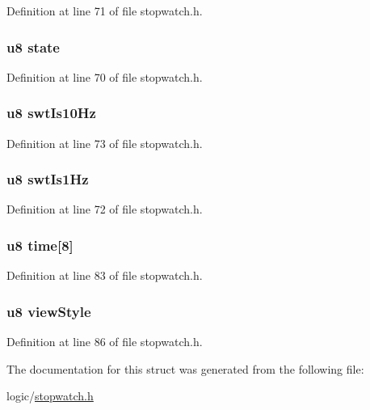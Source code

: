 \-Definition at line 71 of file stopwatch.\-h.

\hypertarget{structstopwatch_ad0bc4e4e6e6ffc52d9079b73afd73887}{
\subsubsection[{state}]{\setlength{\rightskip}{0pt plus 5cm}u8 {\bf state}}}\label{structstopwatch_ad0bc4e4e6e6ffc52d9079b73afd73887}


\-Definition at line 70 of file stopwatch.\-h.

\hypertarget{structstopwatch_a59a4bb7692742b89191e778942eeccba}{
\subsubsection[{swt\-Is10\-Hz}]{\setlength{\rightskip}{0pt plus 5cm}u8 {\bf swt\-Is10\-Hz}}}\label{structstopwatch_a59a4bb7692742b89191e778942eeccba}


\-Definition at line 73 of file stopwatch.\-h.

\hypertarget{structstopwatch_a26bbaf3a098503cb253a15db2ea626c3}{
\subsubsection[{swt\-Is1\-Hz}]{\setlength{\rightskip}{0pt plus 5cm}u8 {\bf swt\-Is1\-Hz}}}\label{structstopwatch_a26bbaf3a098503cb253a15db2ea626c3}


\-Definition at line 72 of file stopwatch.\-h.

\hypertarget{structstopwatch_a2789a512c999ccb6743da309f32eec05}{
\subsubsection[{time}]{\setlength{\rightskip}{0pt plus 5cm}u8 {\bf time}\mbox{[}8\mbox{]}}}\label{structstopwatch_a2789a512c999ccb6743da309f32eec05}


\-Definition at line 83 of file stopwatch.\-h.

\hypertarget{structstopwatch_a1c3b9f9d799364d05f9abf6892baddef}{
\subsubsection[{view\-Style}]{\setlength{\rightskip}{0pt plus 5cm}u8 {\bf view\-Style}}}\label{structstopwatch_a1c3b9f9d799364d05f9abf6892baddef}


\-Definition at line 86 of file stopwatch.\-h.



\-The documentation for this struct was generated from the following file\-:\begin{DoxyCompactItemize}
\item 
logic/\hyperlink{stopwatch_8h}{stopwatch.\-h}\end{DoxyCompactItemize}

